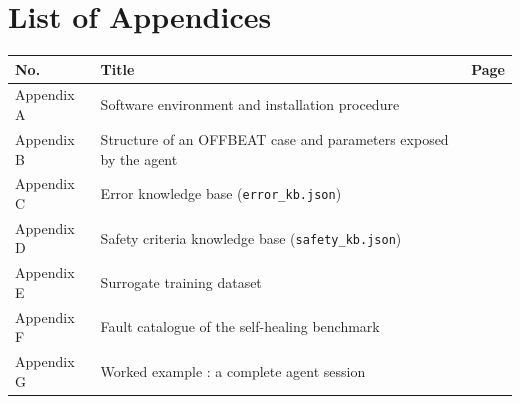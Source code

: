 \documentclass[12pt,a4paper]{report}
\begin{document}
\clearpage

\renewcommand{\contentsname}{Contents}
\setcounter{tocdepth}{1}
\tableofcontents
\clearpage

\renewcommand{\listfigurename}{List of Figures}
\listoffigures
{}
\clearpage

\renewcommand{\listtablename}{List of Tables}
\listoftables
{}
\clearpage

\chapter*{List of Appendices}
\noindent
\begin{tabularx}{\textwidth}{@{}lXr@{}}
\toprule
\textbf{No.} & \textbf{Title} & \textbf{Page}\\
\midrule
Appendix A & Software environment and installation procedure
           & \pageref{ann:install}\\
Appendix B & Structure of an OFFBEAT case and parameters exposed by the agent
           & \pageref{ann:cas}\\
Appendix C & Error knowledge base (\texttt{error\_kb.json})
           & \pageref{ann:errkb}\\
Appendix D & Safety criteria knowledge base (\texttt{safety\_kb.json})
           & \pageref{ann:safetykb}\\
Appendix E & Surrogate training dataset & \pageref{ann:dataset}\\
Appendix F & Fault catalogue of the self-healing benchmark
           & \pageref{ann:bench}\\
Appendix G & Worked example : a complete agent session
           & \pageref{ann:session}\\
\bottomrule
\end{tabularx}

\clearpage
\end{document}
